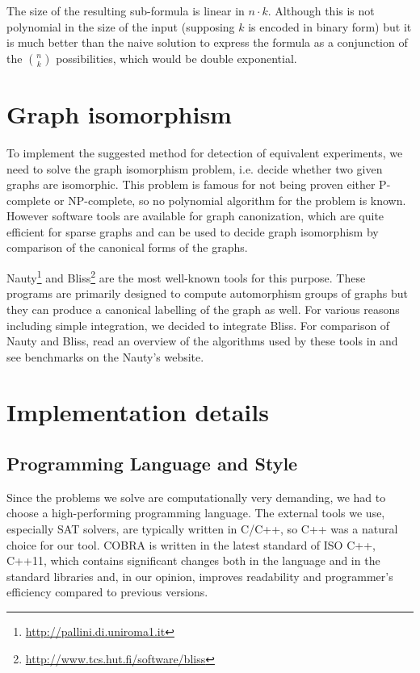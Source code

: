 The size of the resulting sub-formula is linear in $n\cdot k$.
Although this is not polynomial in the size of the input
  (supposing $k$ is encoded in binary form) but it is much better
  than the naive solution to express the formula
  as a conjunction of the $n\choose k$ possibilities,
  which would be double exponential.

\section{Graph isomorphism}

To implement the suggested method for detection of equivalent experiments,
  we need to solve the graph isomorphism problem, i.e. decide whether
  two given graphs are isomorphic.
This problem is famous for not being proven either P-complete or
  NP-complete, so no polynomial algorithm for the problem is known.
However software tools are available for graph canonization,
  which are quite efficient for sparse graphs and can be used to
  decide graph isomorphism by comparison of the canonical forms of the graphs.

Nauty\footnote{\url{http://pallini.di.uniroma1.it}}\cite{nauty} and
  Bliss\footnote{\url{http://www.tcs.hut.fi/software/bliss}}\cite{bliss}
  are the most well-known tools for this purpose.
These programs are primarily designed to compute automorphism groups of graphs
  but they can produce a canonical labelling of the graph as well.
For various reasons including simple integration, we decided to integrate Bliss.
For comparison of Nauty and Bliss,
  read an overview of the algorithms used by these tools in \cite{nautyblissoverview}
  and see benchmarks on the Nauty's website.

\section{Implementation details} \label{sec:impl}

\subsection{Programming Language and Style}

Since the problems we solve are computationally very demanding,
  we had to choose a high-performing programming language.
The external tools we use, especially SAT solvers, are typically written in C/C++,
  so C++ was a natural choice for our tool.
COBRA is written in the latest standard of ISO C++, C++11, which
  contains significant changes both in the language and in the standard libraries
  and, in our opinion, improves readability and programmer's efficiency
  compared to previous versions.

